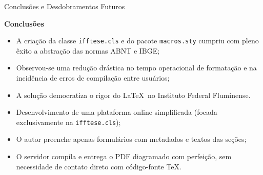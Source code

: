 \documentclass[aspectratio=169, 10pt]{beamer}
\begin{document}
\begin{frame}{Conclusões e Desdobramentos Futuros}
  \begin{block}{\textbf{Conclusões}}
    \begin{itemize}
      \item A criação da classe \texttt{ifftese.cls} e do pacote \texttt{macros.sty} cumpriu com pleno êxito a abstração das normas ABNT e IBGE;
      \item Observou-se uma redução drástica no tempo operacional de formatação e na incidência de erros de compilação entre usuários;
      \item A solução democratiza o rigor do \LaTeX\ no Instituto Federal Fluminense.
    \end{itemize}
  \end{block}

  \vspace{0.2cm}

  \begin{tcolorbox}[colback=conepeteal!10,colframe=conepeteal,title=\textbf{Trabalho em Andamento: Interface Web por Formulários}]
    \begin{itemize}
      \item Desenvolvimento de uma plataforma online simplificada (focada exclusivamente na \texttt{ifftese.cls});
      \item O autor preenche apenas formulários com metadados e textos das seções;
      \item O servidor compila e entrega o PDF diagramado com perfeição, sem necessidade de contato direto com código-fonte TeX.
    \end{itemize}
  \end{tcolorbox}
\end{frame}
\end{document}
